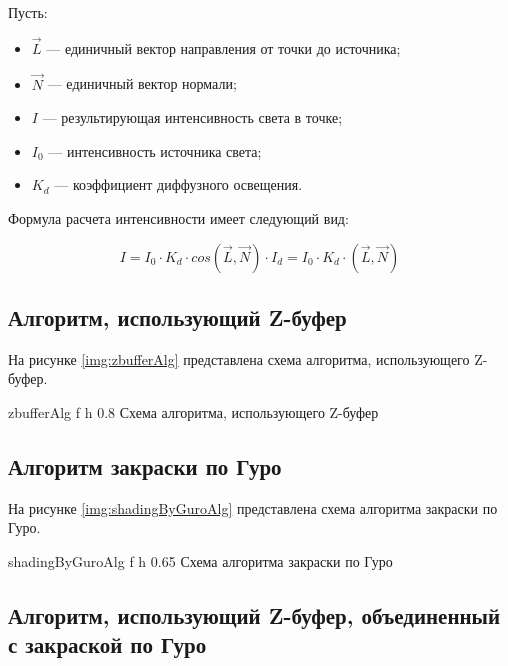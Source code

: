 Пусть:
\begin{itemize}[label*=--]
	\item $\vec{L}$ --- единичный вектор направления от точки до источника;
	\item $\vec{N}$ --- единичный вектор нормали;
	\item $I$ --- результирующая интенсивность света в точке;
	\item $I_0$ --- интенсивность источника света;
	\item $K_d$ --- коэффициент диффузного освещения.
\end{itemize}

Формула расчета интенсивности имеет следующий вид:

\begin{equation}
	\label{equ:lambert}
	I = I_0 \cdot K_d \cdot cos(\vec{L}, \vec{N}) \cdot I_d = I_0 \cdot K_d \cdot (\vec{L}, \vec{N})
\end{equation}


\subsection{Алгоритм, использующий Z-буфер}

На рисунке \ref{img:zbufferAlg} представлена схема алгоритма, использующего Z-буфер.

{zbufferAlg} %
{f} %
{h} %
{0.8\textwidth} %
{Схема алгоритма, использующего Z-буфер} %

\clearpage

\subsection{Алгоритм закраски по Гуро}

На рисунке \ref{img:shadingByGuroAlg} представлена схема алгоритма закраски по Гуро.

{shadingByGuroAlg} %
{f} %
{h} %
{0.65\textwidth} %
{Схема алгоритма закраски по Гуро} %

\clearpage

\subsection{Алгоритм, использующий Z-буфер, объединенный с закраской по Гуро}

